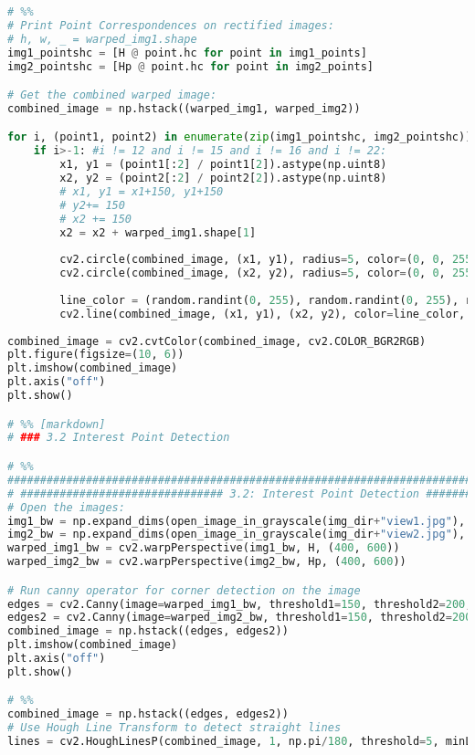 \documentclass{article}
\begin{document}
\begin{lstlisting}[language=Python]
# %%
# Print Point Correspondences on rectified images:
# h, w, _ = warped_img1.shape
img1_pointshc = [H @ point.hc for point in img1_points]
img2_pointshc = [Hp @ point.hc for point in img2_points]

# Get the combined warped image:
combined_image = np.hstack((warped_img1, warped_img2))

for i, (point1, point2) in enumerate(zip(img1_pointshc, img2_pointshc)):
    if i>-1: #i != 12 and i != 15 and i != 16 and i != 22:
        x1, y1 = (point1[:2] / point1[2]).astype(np.uint8)
        x2, y2 = (point2[:2] / point2[2]).astype(np.uint8)
        # x1, y1 = x1+150, y1+150
        # y2+= 150
        # x2 += 150
        x2 = x2 + warped_img1.shape[1]
        
        cv2.circle(combined_image, (x1, y1), radius=5, color=(0, 0, 255), thickness=-1)
        cv2.circle(combined_image, (x2, y2), radius=5, color=(0, 0, 255), thickness=-1)
        
        line_color = (random.randint(0, 255), random.randint(0, 255), random.randint(0, 255))
        cv2.line(combined_image, (x1, y1), (x2, y2), color=line_color, thickness=2)
    
combined_image = cv2.cvtColor(combined_image, cv2.COLOR_BGR2RGB)
plt.figure(figsize=(10, 6))
plt.imshow(combined_image)
plt.axis("off")
plt.show()

# %% [markdown]
# ### 3.2 Interest Point Detection

# %%
#################################################################################################
# ############################### 3.2: Interest Point Detection ###################################
# Open the images:
img1_bw = np.expand_dims(open_image_in_grayscale(img_dir+"view1.jpg"), axis=-1)
img2_bw = np.expand_dims(open_image_in_grayscale(img_dir+"view2.jpg"), axis=-1)
warped_img1_bw = cv2.warpPerspective(img1_bw, H, (400, 600))
warped_img2_bw = cv2.warpPerspective(img2_bw, Hp, (400, 600))

# Run canny operator for corner detection on the image
edges = cv2.Canny(image=warped_img1_bw, threshold1=150, threshold2=200, apertureSize=3)
edges2 = cv2.Canny(image=warped_img2_bw, threshold1=150, threshold2=200, apertureSize=3)
combined_image = np.hstack((edges, edges2))
plt.imshow(combined_image)
plt.axis("off")
plt.show()

# %%
combined_image = np.hstack((edges, edges2))
# Use Hough Line Transform to detect straight lines
lines = cv2.HoughLinesP(combined_image, 1, np.pi/180, threshold=5, minLineLength=40, maxLineGap=10)


\end{lstlisting}
\end{document}
